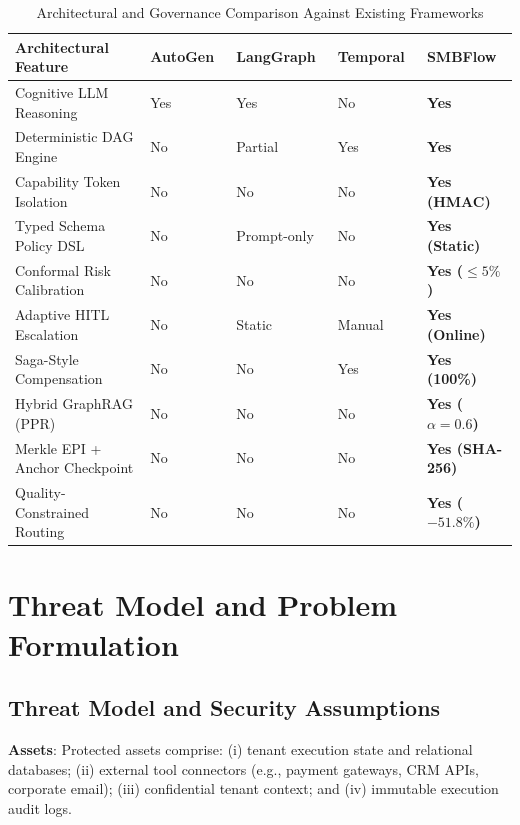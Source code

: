 \documentclass[conference]{IEEEtran}
\begin{document}
\begin{table}[t]
\caption{Architectural and Governance Comparison Against Existing Frameworks}
\label{tab:related_work}
\centering
\scriptsize
\setlength{\tabcolsep}{2.5pt}
\begin{tabularx}{\linewidth}{l X X X X}
\toprule
\textbf{Architectural Feature} & \textbf{AutoGen}~\cite{wu2023autogen} & \textbf{LangGraph}~\cite{langgraph2024} & \textbf{Temporal}~\cite{temporal2022} & \textbf{SMBFlow} \\
\midrule
Cognitive LLM Reasoning & Yes & Yes & No & \textbf{Yes} \\
Deterministic DAG Engine & No & Partial & Yes & \textbf{Yes} \\
Capability Token Isolation & No & No & No & \textbf{Yes (HMAC)} \\
Typed Schema Policy DSL & No & Prompt-only & No & \textbf{Yes (Static)} \\
Conformal Risk Calibration & No & No & No & \textbf{Yes ($\le 5\%$)} \\
Adaptive HITL Escalation & No & Static & Manual & \textbf{Yes (Online)} \\
Saga-Style Compensation & No & No & Yes & \textbf{Yes (100\%)} \\
Hybrid GraphRAG (PPR) & No & No & No & \textbf{Yes ($\alpha=0.6$)} \\
Merkle EPI + Anchor Checkpoint & No & No & No & \textbf{Yes (SHA-256)} \\
Quality-Constrained Routing & No & No & No & \textbf{Yes ($-51.8\%$)} \\
\bottomrule
\end{tabularx}
\end{table}

\section{Threat Model and Problem Formulation}

\subsection{Threat Model and Security Assumptions}
\textbf{Assets}: Protected assets comprise: (i) tenant execution state and relational databases; (ii) external tool connectors (e.g., payment gateways, CRM APIs, corporate email); (iii) confidential tenant context; and (iv) immutable execution audit logs.
\end{document}
